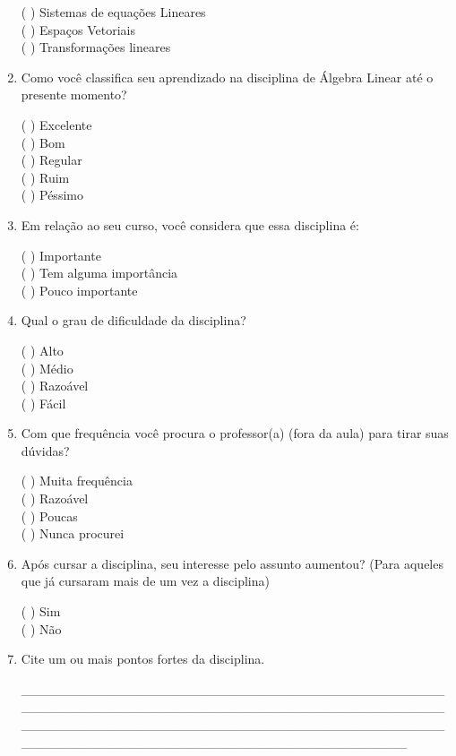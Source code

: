\begin{enumerate}
(  ) Sistemas de equações Lineares\\
(  ) Espaços Vetoriais\\
(  ) Transformações lineares
	
\item Como você classifica seu aprendizado na disciplina de Álgebra Linear até o presente momento?

(   ) Excelente\\
(   ) Bom\\
(   ) Regular\\
(   ) Ruim\\
(   ) Péssimo

\item Em relação ao seu curso, você considera que essa disciplina é:

(   ) Importante\\
(   ) Tem alguma importância\\
(   ) Pouco importante

\item Qual o grau de dificuldade da disciplina?

(   ) Alto\\
(   ) Médio\\
(   ) Razoável\\
(   ) Fácil

\item Com que frequência você procura o professor(a) (fora da aula) para tirar suas dúvidas?

(   ) Muita frequência\\
(   ) Razoável\\
(   ) Poucas\\
(   ) Nunca procurei

\item Após cursar a disciplina, seu interesse pelo assunto aumentou? (Para aqueles que já cursaram mais de um vez a disciplina)

(   ) Sim\\
(   ) Não

\item Cite um ou mais pontos fortes da disciplina.

\_\_\_\_\_\_\_\_\_\_\_\_\_\_\_\_\_\_\_\_\_\_\_\_\_\_\_\_\_\_\_\_\_\_\_\_\_\_\_\_\_\_\_\_\_\_\_\_\_\_\_\_\_\_\_\_\_\_\_\_\_\_\_\_\_\_\_\_\_\_\_\_\_\_\_\_\_\_\_\_\_\_\_\_\_\_\_\_\_\_\_\_\_\_\_\_\_\_\_\_\_\_\_\_\_\_\_\_\_\_\_\_\_\_\_\_\_\_\_\_\_\_\_\_\_\_\_\_\_\_\_\_\_\_\_\_\_\_\_\_\_\_\_\_\_\_\_\_\_\_\_\_\_\_\_\_\_\_\_\_\_\_\_\_\_\_\_\_\_\_\_\_\_\_\_\_


\end{enumerate}
